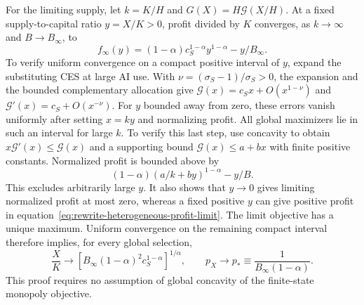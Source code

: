 For the limiting supply, let $k=K/H$ and $G(X)=H\mathcal G(X/H)$.
At a fixed supply-to-capital ratio $y=X/K>0$, profit divided by $K$ converges,
as $k\to\infty$ and $B\to B_\infty$, to
\begin{equation}
 f_\infty(y)=(1-\alpha)c_S^{1-\alpha}y^{1-\alpha}-y/B_\infty.
 \label{eq:rewrite-heterogeneous-profit-limit}
\end{equation}
To verify uniform convergence on a compact positive interval of $y$,
expand the substituting CES at large AI use. With
$\nu=(\sigma_S-1)/\sigma_S>0$, the expansion and the bounded complementary
allocation give $\mathcal G(x)=c_Sx+O(x^{1-\nu})$ and
$\mathcal G'(x)=c_S+O(x^{-\nu})$. For $y$ bounded away from zero,
these errors vanish uniformly after setting $x=ky$ and normalizing profit.
All global
maximizers lie in such an interval for large $k$. To verify this last step,
use concavity to obtain $x\mathcal G'(x)\leq\mathcal G(x)$ and a supporting
bound $\mathcal G(x)\leq a+bx$ with finite positive constants. Normalized
profit is bounded above by
\[
 (1-\alpha)(a/k+by)^{1-\alpha}-y/B.
\]
This excludes arbitrarily large $y$. It also shows that $y\to0$ gives
limiting normalized profit at most zero, whereas a fixed positive $y$ can
give positive profit in equation~\eqref{eq:rewrite-heterogeneous-profit-limit}.
The limit objective has a unique maximum. Uniform convergence on the
remaining compact interval therefore implies, for every global selection,
\begin{equation}
 \frac{X}{K}\to
 [B_\infty(1-\alpha)^2c_S^{1-\alpha}]^{1/\alpha},\qquad
 p_X\to p_*\equiv\frac1{B_\infty(1-\alpha)}.
 \label{eq:rewrite-heterogeneous-supply-limit}
\end{equation}
This proof requires no assumption of global concavity of the finite-state
monopoly objective.

